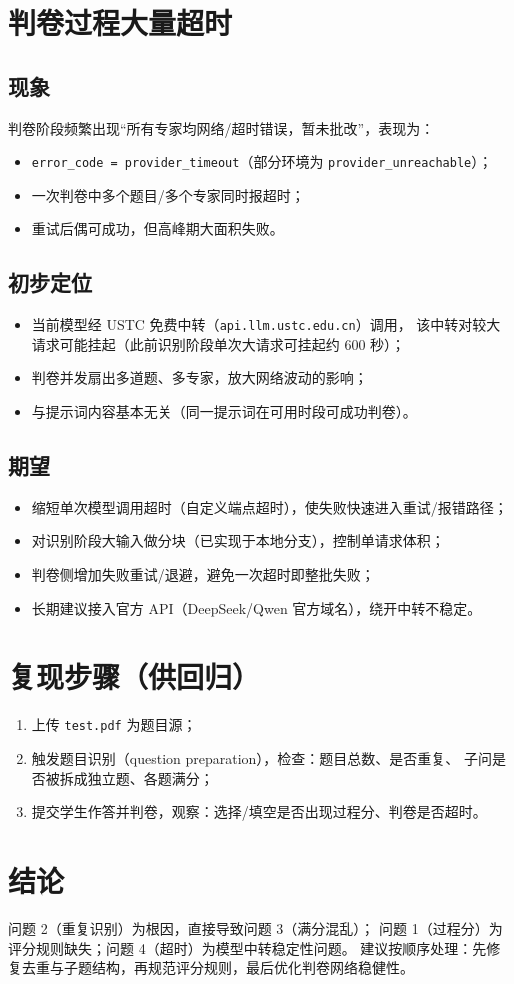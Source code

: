 \documentclass[12pt,a4paper]{ctexart}
\begin{document}
\section{判卷过程大量超时}

\subsection{现象}
判卷阶段频繁出现“所有专家均网络/超时错误，暂未批改”，表现为：
\begin{itemize}[leftmargin=2em]
  \item \texttt{error\_code = provider\_timeout}（部分环境为
        \texttt{provider\_unreachable}）；
  \item 一次判卷中多个题目/多个专家同时报超时；
  \item 重试后偶可成功，但高峰期大面积失败。
\end{itemize}

\subsection{初步定位}
\begin{itemize}[leftmargin=2em]
  \item 当前模型经 USTC 免费中转（\texttt{api.llm.ustc.edu.cn}）调用，
        该中转对较大请求可能挂起（此前识别阶段单次大请求可挂起约 600 秒）；
  \item 判卷并发扇出多道题、多专家，放大网络波动的影响；
  \item 与提示词内容基本无关（同一提示词在可用时段可成功判卷）。
\end{itemize}

\subsection{期望}
\begin{itemize}[leftmargin=2em]
  \item 缩短单次模型调用超时（自定义端点超时），使失败快速进入重试/报错路径；
  \item 对识别阶段大输入做分块（已实现于本地分支），控制单请求体积；
  \item 判卷侧增加失败重试/退避，避免一次超时即整批失败；
  \item 长期建议接入官方 API（DeepSeek/Qwen 官方域名），绕开中转不稳定。
\end{itemize}

\section*{复现步骤（供回归）}
\begin{enumerate}[leftmargin=2em]
  \item 上传 \texttt{test.pdf} 为题目源；
  \item 触发题目识别（question preparation），检查：题目总数、是否重复、
        子问是否被拆成独立题、各题满分；
  \item 提交学生作答并判卷，观察：选择/填空是否出现过程分、判卷是否超时。
\end{enumerate}

\section*{结论}
问题 2（重复识别）为根因，直接导致问题 3（满分混乱）；
问题 1（过程分）为评分规则缺失；问题 4（超时）为模型中转稳定性问题。
建议按顺序处理：先修复去重与子题结构，再规范评分规则，最后优化判卷网络稳健性。
\end{document}
